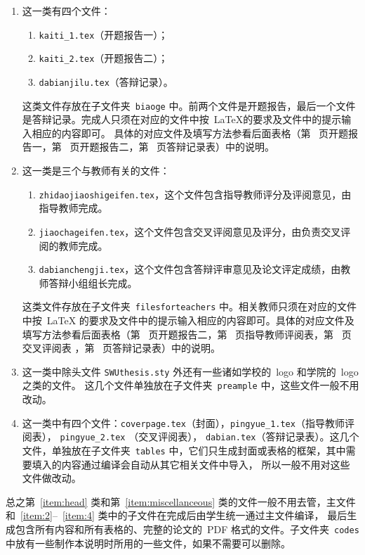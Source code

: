 \begin{enumerate}
	\item 这一类有四个文件：
	\begin{enumerate}
		\item {\tt kaiti\_1.tex}（开题报告一）；
		\item {\tt kaiti\_2.tex}（开题报告二）；
		\item {\tt dabianjilu.tex}（答辩记录）。
	\end{enumerate}
	这类文件存放在子文件夹~{\tt biaoge} 中。前两个文件是开题报告，最后一个文件是答辩记录。完成人只须在对应的文件中按~\LaTeX 的要求及文件中的提示输入相应的内容即可。
	具体的对应文件及填写方法参看后面表格（第~\pageref{table:kaiti_1} 页开题报告一，第~\pageref{table:kaiti_2} 页开题报告二，第~\pageref{table:dabianjilu} 页答辩记录表）中的说明。
	\item\label{item:4} 这一类是三个与教师有关的文件：
	\begin{enumerate}
		\item\label{term1} {\tt zhidaojiaoshigeifen.tex}，这个文件包含指导教师评分及评阅意见，由指导教师完成。
		\item {\tt jiaochageifen.tex}，这个文件包含交叉评阅意见及评分，由负责交叉评阅的教师完成。
		\item {\tt dabianchengji.tex}，这个文件包含答辩评审意见及论文评定成绩，由教师答辩小组组长完成。
	\end{enumerate}
	这类文件存放在子文件夹~{\tt filesforteachers} 中。相关教师只须在对应的文件中按~\LaTeX
	的要求及文件中的提示输入相应的内容即可。具体的对应文件及填写方法参看后面表格（第~\pageref{table:kaiti_2} 页开题报告二，第~\pageref{table:pingyue} 页指导教师评阅表，第~\pageref{table:jiaochapingyue} 页交叉评阅表
	，第~\pageref{table:dabianjilu} 页答辩记录表）中的说明。
	\item\label{item:head} 这一类中除头文件{ \tt SWUthesis.sty} 外还有一些诸如学校的~logo 和学院的~logo 之类的文件。
	这几个文件单独放在子文件夹~{\tt preample} 中，这些文件一般不用改动。
	
	\item\label{item:miscellanceous} 这一类中有四个文件：{\tt coverpage.tex}（封面），{\tt pingyue\_1.tex}（指导教师评阅表）， {\tt pingyue\_2.tex} （交叉评阅表），
	{\tt dabian.tex}（答辩记录表）。这几个文件，单独放在子文件夹~{\tt tables} 中，它们只生成封面或表格的框架，其中需要填入的内容通过编译会自动从其它相关文件中导入，
	所以一般不用对这些文件做改动。
\end{enumerate}
总之第~\ref{item:head} 类和第~\ref{item:miscellanceous} 类的文件一般不用去管，主文件和~\ref{item:2}--~\ref{item:4} 类中的子文件在完成后由学生统一通过主文件编译，
最后生成包含所有内容和所有表格的、完整的论文的~PDF 格式的文件。子文件夹~{\tt codes} 中放有一些制作本说明时所用的一些文件，如果不需要可以删除。
